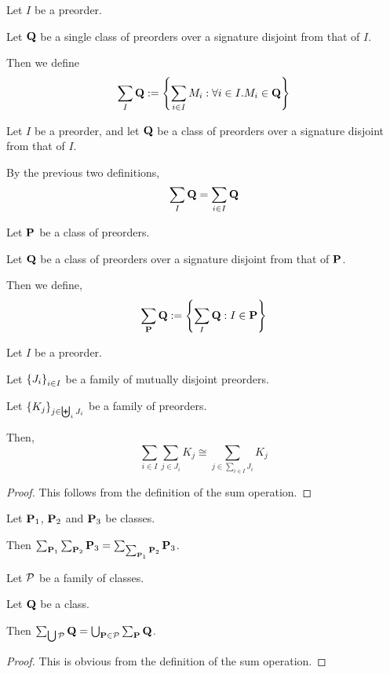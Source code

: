 \begin{definition}
  Let $I$ be a preorder.

  Let $\mathbf{Q}$ be a single class of preorders
  over a signature disjoint from that of $I$.

  Then we define
  \[
    \sum_{I}{\mathbf{Q}} := \left\{ {\sum_{i \in I}{M_i} : \forall i \in I. M_i \in \mathbf{Q}} \right\}
  \]
\end{definition}

\begin{note}
  Let $I$ be a preorder, and let $\mathbf{Q}$ be a class of preorders
  over a signature disjoint from that of $I$.

  By the previous two definitions,
  \[
    \sum_{I}{\mathbf{Q}} = \sum_{i \in I}{\mathbf{Q}}
  \]
\end{note}

\begin{definition}
  Let $\mathbf{P}$ be a class of preorders.

  Let $\mathbf{Q}$ be a class of preorders over a signature disjoint from that of $\mathbf{P}$.

  Then we define,
  \[
    \sum_{\mathbf{P}}{\mathbf{Q}} := \left\{ {\sum_{I}{\mathbf{Q}} : I \in \mathbf{P}} \right\}
  \]
\end{definition}

\begin{lemma}
  Let $I$ be a preorder.

  Let $\left\{ {J_i} \right\}_{i \in I}$ be a family of mutually disjoint preorders.

  Let $\left\{ {K_j} \right\}_{j \in \biguplus_i J_i}$ be a family of preorders.

  Then,
  \[
    \sum_{i \in I}{\sum_{j \in J_i}{K_j}} \cong \sum_{j \in \sum_{i \in I}{J_i}}{K_j}
  \]
\end{lemma}

\begin{proof}
  This follows from the definition of the sum operation.
\end{proof}

\begin{corollary}
  Let $\mathbf{P}_1$, $\mathbf{P}_2$ and $\mathbf{P}_3$ be classes.

  Then $\sum_{\mathbf{P}_1}{\sum_{\mathbf{P}_2}{\mathbf{P}_3}} = \sum_{\sum_{\mathbf{P}_1}{\mathbf{P}_2}}{\mathbf{P}_3}$.
\end{corollary}

\begin{lemma}
  Let $\mathcal{P}$ be a family of classes.

  Let $\mathbf{Q}$ be a class.

  Then $\sum_{\bigcup \mathcal{P}}{\mathbf{Q}} = \bigcup_{\mathbf{P} \in \mathcal{P}}{\sum_{\mathbf{P}}{\mathbf{Q}}}$.
\end{lemma}

\begin{proof}
  This is obvious from the definition of the sum operation.
\end{proof}
